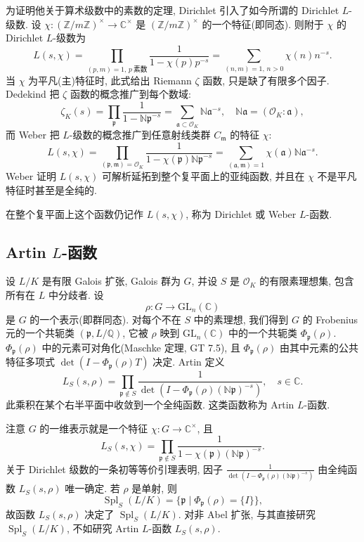 为证明他关于算术级数中的素数的定理, Dirichlet 引入了如今所谓的 Dirichlet $L$-级数. 设 $\chi \colon (\mathbb{Z}/m\mathbb{Z})^{\times} \to \mathbb{C}^{\times}$ 是 $(\mathbb{Z}/m\mathbb{Z})^{\times}$ 的一个特征(即同态). 则附于 $\chi$ 的 Dirichlet $L$-级数为
\[
L(s, \chi) = \prod_{(p,m)=1,\,p\ \text{素数}} \frac{1}{1 - \chi(p)p^{-s}} = \sum_{(n,m)=1,\,n>0} \chi(n)n^{-s}.
\]
当 $\chi$ 为平凡(主)特征时, 此式给出 Riemann $\zeta$ 函数, 只是缺了有限多个因子. Dedekind 把 $\zeta$ 函数的概念推广到每个数域:
\[
\zeta_{K}(s) = \prod_{\mathfrak{p}} \frac{1}{1 - \mathbb{N}\mathfrak{p}^{-s}} = \sum_{\mathfrak{a} \subset \mathcal{O}_{K}} \mathbb{N}\mathfrak{a}^{-s}, \quad \mathbb{N}\mathfrak{a} = (\mathcal{O}_{K} : \mathfrak{a}),
\]
而 Weber 把 $L$-级数的概念推广到任意射线类群 $C_{\mathfrak{m}}$ 的特征 $\chi$:
\[
L(s, \chi) = \prod_{(\mathfrak{p},\mathfrak{m})=\mathcal{O}_{K}} \frac{1}{1 - \chi(\mathfrak{p})\mathbb{N}\mathfrak{p}^{-s}} = \sum_{(\mathfrak{a},\mathfrak{m})=1} \chi(\mathfrak{a})\mathbb{N}\mathfrak{a}^{-s}.
\]
Weber 证明 $L(s,\chi)$ 可解析延拓到整个复平面上的亚纯函数, 并且在 $\chi$ 不是平凡特征时甚至是全纯的.

在整个复平面上这个函数仍记作 $L(s,\chi)$, 称为 Dirichlet 或 Weber $L$-函数.

\subsection*{Artin $L$-函数}

设 $L/K$ 是有限 Galois 扩张, Galois 群为 $G$, 并设 $S$ 是 $\mathcal{O}_{K}$ 的有限素理想集, 包含所有在 $L$ 中分歧者. 设
\[
\rho \colon G \to \mathrm{GL}_{n}(\mathbb{C})
\]
是 $G$ 的一个表示(即群同态). 对每个不在 $S$ 中的素理想, 我们得到 $G$ 的 Frobenius 元的一个共轭类 $(\mathfrak{p}, L/\mathbb{Q})$, 它被 $\rho$ 映到 $\mathrm{GL}_{n}(\mathbb{C})$ 中的一个共轭类 $\Phi_{\mathfrak{p}}(\rho)$. $\Phi_{\mathfrak{p}}(\rho)$ 中的元素可对角化(Maschke 定理, GT 7.5), 且 $\Phi_{\mathfrak{p}}(\rho)$ 由其中元素的公共特征多项式 $\det(I - \Phi_{\mathfrak{p}}(\rho)T)$ 决定. Artin 定义
\[
L_{S}(s, \rho) = \prod_{\mathfrak{p} \notin S} \frac{1}{\det(I - \Phi_{\mathfrak{p}}(\rho)(\mathbb{N}\mathfrak{p})^{-s})}, \quad s \in \mathbb{C}.
\]
此乘积在某个右半平面中收敛到一个全纯函数. 这类函数称为 Artin $L$-函数.

注意 $G$ 的一维表示就是一个特征 $\chi \colon G \to \mathbb{C}^{\times}$, 且
\[
L_{S}(s, \chi) = \prod_{\mathfrak{p} \notin S} \frac{1}{1 - \chi(\mathfrak{p})(\mathbb{N}\mathfrak{p})^{-s}}.
\]
关于 Dirichlet 级数的一条初等等价引理表明, 因子 $\frac{1}{\det(I - \Phi_{\mathfrak{p}}(\rho)(\mathbb{N}\mathfrak{p})^{-s})}$ 由全纯函数 $L_{S}(s, \rho)$ 唯一确定. 若 $\rho$ 是单射, 则
\[
\operatorname{Spl}_{S}(L/K) = \{\mathfrak{p} \mid \Phi_{\mathfrak{p}}(\rho) = \{I\}\},
\]
故函数 $L_{S}(s, \rho)$ 决定了 $\operatorname{Spl}_{S}(L/K)$. 对非 Abel 扩张, 与其直接研究 $\operatorname{Spl}_{S}(L/K)$, 不如研究 Artin $L$-函数 $L_{S}(s, \rho)$.

